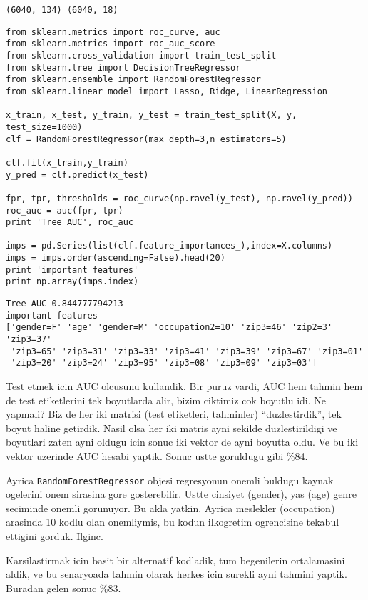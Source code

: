 \documentclass[12pt,fleqn]{article}\usepackage{../common}
\begin{document}
\begin{verbatim}
(6040, 134) (6040, 18)
\end{verbatim}

\begin{verbatim}
from sklearn.metrics import roc_curve, auc
from sklearn.metrics import roc_auc_score
from sklearn.cross_validation import train_test_split
from sklearn.tree import DecisionTreeRegressor
from sklearn.ensemble import RandomForestRegressor
from sklearn.linear_model import Lasso, Ridge, LinearRegression

x_train, x_test, y_train, y_test = train_test_split(X, y, test_size=1000)
clf = RandomForestRegressor(max_depth=3,n_estimators=5)

clf.fit(x_train,y_train)
y_pred = clf.predict(x_test)

fpr, tpr, thresholds = roc_curve(np.ravel(y_test), np.ravel(y_pred))
roc_auc = auc(fpr, tpr)
print 'Tree AUC', roc_auc

imps = pd.Series(list(clf.feature_importances_),index=X.columns)
imps = imps.order(ascending=False).head(20)
print 'important features'
print np.array(imps.index)
\end{verbatim}

\begin{verbatim}
Tree AUC 0.844777794213
important features
['gender=F' 'age' 'gender=M' 'occupation2=10' 'zip3=46' 'zip2=3' 'zip3=37'
 'zip3=65' 'zip3=31' 'zip3=33' 'zip3=41' 'zip3=39' 'zip3=67' 'zip3=01'
 'zip3=20' 'zip3=24' 'zip3=95' 'zip3=08' 'zip3=09' 'zip3=03']
\end{verbatim}

Test etmek icin AUC olcusunu kullandik. Bir puruz vardi, AUC hem tahmin hem
de test etiketlerini tek boyutlarda alir, bizim ciktimiz cok boyutlu
idi. Ne yapmali?  Biz de her iki matrisi (test etiketleri, tahminler)
``duzlestirdik'', tek boyut haline getirdik. Nasil olsa her iki matris ayni
sekilde duzlestirildigi ve boyutlari zaten ayni oldugu icin sonuc iki
vektor de ayni boyutta oldu. Ve bu iki vektor uzerinde AUC hesabi
yaptik. Sonuc ustte goruldugu gibi \%84.

Ayrica \verb!RandomForestRegressor! objesi regresyonun onemli buldugu
kaynak ogelerini onem sirasina gore gosterebilir. Ustte cinsiyet (gender),
yas (age) genre seciminde onemli gorunuyor. Bu akla yatkin. Ayrica
meslekler (occupation) arasinda 10 kodlu olan onemliymis, bu kodun
ilkogretim ogrencisine tekabul ettigini gorduk. Ilginc.

Karsilastirmak icin basit bir alternatif kodladik, tum begenilerin
ortalamasini aldik, ve bu senaryoada tahmin olarak herkes icin surekli ayni
tahmini yaptik. Buradan gelen sonuc \%83. 
\end{document}
